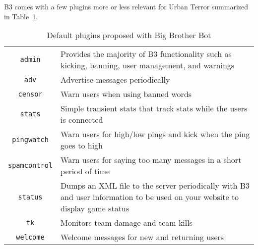 B3 comes with a few plugins more or less relevant for Urban Terror summarized in
Table~\ref{tab:b3:plugins}. 
\begin{table}[ht]
  \centering\small
  \begin{tabular}{|c|p{}|}
    \hline
    \texttt{admin} & Provides the majority of B3 functionality such as kicking,
    banning, user management, and warnings\\
    \texttt{adv} & Advertise messages periodically\\
    \texttt{censor} & Warn users when using banned words\\
    \texttt{stats} & Simple transient stats that track stats while the users
    is connected\\ 
    \texttt{pingwatch} & Warn users for high/low pings and kick when the ping
    goes to high\\ 
    \texttt{spamcontrol} & Warn users for saying too many messages in a short
    period of time\\ 
    \texttt{status} &  Dumps an XML file to the server periodically with B3 and
    user information to be used on your website to display game status \\
    \texttt{tk} & Monitors team damage and team kills\\ 
    \texttt{welcome} &Welcome messages for new and returning users\\\hline 
  \end{tabular}
  \caption{Default plugins proposed with Big Brother Bot}
  \label{tab:b3:plugins}
\end{table}

